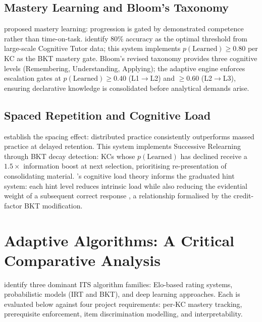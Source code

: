 \subsection{Mastery Learning and Bloom's Taxonomy}
\label{subsec:lr_mastery}

\textcite{bloom1984} proposed mastery learning: progression is gated by
demonstrated competence rather than time-on-task. \textcite{ritter2016} identify
80\% accuracy as the optimal threshold from large-scale Cognitive Tutor data;
this system implements $p(\text{Learned}) \geq 0.80$ per KC as the BKT mastery
gate. Bloom's revised taxonomy \parencite{anderson2001} provides three cognitive
levels (Remembering, Understanding, Applying); the adaptive engine enforces
escalation gates at $p(\text{Learned}) \geq 0.40$ (L1$\to$L2) and
$\geq 0.60$ (L2$\to$L3), ensuring declarative knowledge is consolidated before
analytical demands arise.

\subsection{Spaced Repetition and Cognitive Load}
\label{subsec:lr_spacing}

\textcite{cepeda2006} establish the spacing effect: distributed practice
consistently outperforms massed practice at delayed retention. This system
implements Successive Relearning \parencite{kornell2009} through BKT decay
detection: KCs whose $p(\text{Learned})$ has declined receive a $1.5\times$
information boost at next selection, prioritising re-presentation of
consolidating material. \textcite{sweller1988}'s cognitive load theory
informs the graduated hint system: each hint level reduces intrinsic load
while also reducing the evidential weight of a subsequent correct response
\parencite{koedinger2007}, a relationship formalised by the credit-factor
BKT modification.

\section{Adaptive Algorithms: A Critical Comparative Analysis}
\label{sec:lr_algorithms}

\textcite{matos2025} identify three dominant ITS algorithm families: Elo-based
rating systems, probabilistic models (IRT and BKT), and deep learning
approaches. Each is evaluated below against four project requirements:
per-KC mastery tracking, prerequisite enforcement, item discrimination
modelling, and interpretability.

